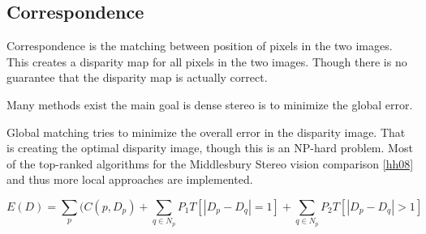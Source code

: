 %
%
%
%
%
%

\subsection{Correspondence} \label{sec:correspondence}

Correspondence is the matching between position of pixels in the two images. This creates a disparity map for all pixels in the two images. Though there is no guarantee that the disparity map is actually correct. 


Many methods exist the main goal is dense stereo is to minimize the global error. 


Global matching tries to minimize the overall error in the disparity image. That is creating the optimal disparity image, though this is an NP-hard problem. Most of the top-ranked algorithms for the Middlesbury Stereo vision comparison \ref{hh08} and thus more local approaches are implemented. 


\[ E(D) = \sum\limits_{p}(C(p,D_{p}) + \sum\limits_{q \in N_{p} } P_{1} T [|D_{p} - D_{q}| = 1] + \sum\limits_{q \in N_{p} } P_{2} T [|D_{p} - D_{q}| > 1] \]


